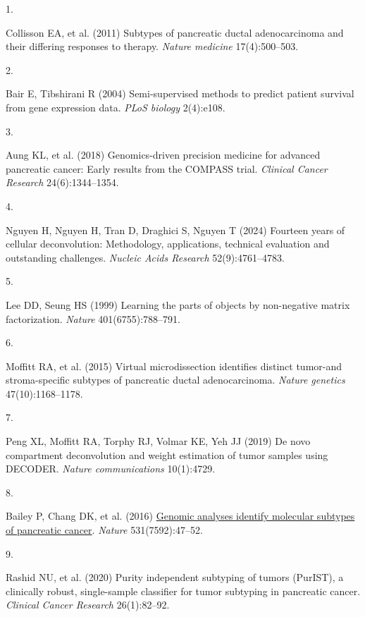 \documentclass[9pt,twocolumn,twoside,]{pnas-new}
\newlength{\cslhangindent}
\newlength{\csllabelwidth}
\newenvironment{CSLReferences}[2] %
 {\begin{list}{}{%
  \setlength{\itemindent}{0pt}
  \setlength{\leftmargin}{0pt}
  \setlength{\parsep}{0pt}
  \ifodd #1
   \setlength{\leftmargin}{\cslhangindent}
   \setlength{\itemindent}{-1\cslhangindent}
  \fi
  \setlength{\itemsep}{#2\baselineskip}}}
 {\end{list}}
\newcommand{\CSLLeftMargin}[1]{\parbox[t]{\csllabelwidth}{#1}}
\newcommand{\CSLRightInline}[1]{\parbox[t]{\linewidth - \csllabelwidth}{#1}\break}
\begin{document}
\label{refs}
\begin{CSLReferences}{0}{1}
\CSLLeftMargin{1. }%
\CSLRightInline{Collisson EA, et al. (2011) Subtypes of pancreatic
ductal adenocarcinoma and their differing responses to therapy.
\emph{Nature medicine} 17(4):500--503.}

\CSLLeftMargin{2. }%
\CSLRightInline{Bair E, Tibshirani R (2004) Semi-supervised methods to
predict patient survival from gene expression data. \emph{PLoS biology}
2(4):e108.}

\CSLLeftMargin{3. }%
\CSLRightInline{Aung KL, et al. (2018) Genomics-driven precision
medicine for advanced pancreatic cancer: Early results from the COMPASS
trial. \emph{Clinical Cancer Research} 24(6):1344--1354.}

\CSLLeftMargin{4. }%
\CSLRightInline{Nguyen H, Nguyen H, Tran D, Draghici S, Nguyen T (2024)
Fourteen years of cellular deconvolution: Methodology, applications,
technical evaluation and outstanding challenges. \emph{Nucleic Acids
Research} 52(9):4761--4783.}

\CSLLeftMargin{5. }%
\CSLRightInline{Lee DD, Seung HS (1999) Learning the parts of objects by
non-negative matrix factorization. \emph{Nature} 401(6755):788--791.}

\CSLLeftMargin{6. }%
\CSLRightInline{Moffitt RA, et al. (2015) Virtual microdissection
identifies distinct tumor-and stroma-specific subtypes of pancreatic
ductal adenocarcinoma. \emph{Nature genetics} 47(10):1168--1178.}

\CSLLeftMargin{7. }%
\CSLRightInline{Peng XL, Moffitt RA, Torphy RJ, Volmar KE, Yeh JJ (2019)
De novo compartment deconvolution and weight estimation of tumor samples
using DECODER. \emph{Nature communications} 10(1):4729.}

\CSLLeftMargin{8. }%
\CSLRightInline{Bailey P, Chang DK, et al. (2016)
\href{https://doi.org/10.1038/nature16965}{Genomic analyses identify
molecular subtypes of pancreatic cancer}. \emph{Nature}
531(7592):47--52.}

\CSLLeftMargin{9. }%
\CSLRightInline{Rashid NU, et al. (2020) Purity independent subtyping of
tumors (PurIST), a clinically robust, single-sample classifier for tumor
subtyping in pancreatic cancer. \emph{Clinical Cancer Research}
26(1):82--92.}


\end{CSLReferences}
\end{document}
